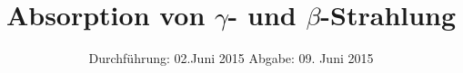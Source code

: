 
\subject{Anfängerpraktikum V704}
\title{Absorption von \texorpdfstring{$\gamma$}{Gamma}- und \texorpdfstring{$\beta$}{Beta}-Strahlung }
\date{
  Durchführung: 02.Juni 2015
  \hspace{3em}
  Abgabe: 09. Juni 2015
}


\maketitle
\thispagestyle{empty}
\newpage





\nocite{skript}
\printbibliography

